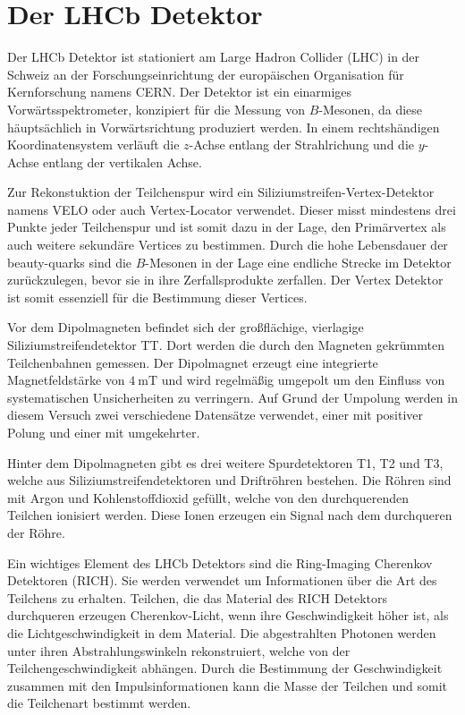 \section{Der LHCb Detektor}
\label{sec:lhcb}

Der LHCb Detektor \cite{lhcb} ist stationiert am Large Hadron Collider (LHC) in
der Schweiz an der Forschungseinrichtung der europäischen
Organisation für Kernforschung namens CERN. Der Detektor ist ein einarmiges
Vorwärtsspektrometer, konzipiert für die Messung von $B$-Mesonen, da diese
häuptsächlich in Vorwärtsrichtung produziert werden. In einem rechtshändigen
Koordinatensystem verläuft die $z$-Achse entlang der Strahlrichung und die
$y$-Achse entlang der vertikalen Achse. \par

Zur Rekonstuktion der Teilchenspur wird ein Siliziumstreifen-Vertex-Detektor
namens VELO oder auch Vertex-Locator verwendet. Dieser misst mindestens drei
Punkte jeder Teilchenspur und ist somit dazu in der Lage, den Primärvertex als
auch weitere sekundäre Vertices zu bestimmen. Durch die hohe Lebensdauer der beauty-quarks
sind die $B$-Mesonen in der Lage eine endliche Strecke im Detektor zurückzulegen,
bevor sie in ihre Zerfallsprodukte zerfallen. Der Vertex Detektor ist somit
essenziell für die Bestimmung dieser Vertices. \par
Vor dem Dipolmagneten befindet sich
der großflächige, vierlagige Siliziumstreifendetektor TT. Dort werden die durch den
Magneten gekrümmten Teilchenbahnen gemessen. Der Dipolmagnet erzeugt eine
integrierte Magnetfeldstärke von $\SI{4}{\milli\tesla}$ und wird regelmäßig
umgepolt um den Einfluss von systematischen Unsicherheiten zu verringern. Auf Grund
der Umpolung werden in diesem Versuch zwei verschiedene Datensätze verwendet, einer
mit positiver Polung und einer mit umgekehrter. \par
Hinter dem Dipolmagneten gibt es drei weitere Spurdetektoren T1, T2 und T3, welche
aus Siliziumstreifendetektoren und Driftröhren bestehen. Die Röhren sind mit
Argon und Kohlenstoffdioxid gefüllt, welche von den durchquerenden Teilchen
ionisiert werden. Diese Ionen erzeugen ein Signal nach dem durchqueren der Röhre. \par

Ein wichtiges Element des LHCb Detektors sind die Ring-Imaging Cherenkov Detektoren (RICH).
Sie werden verwendet um Informationen über die Art des Teilchens zu erhalten. Teilchen,
die das Material des RICH Detektors durchqueren erzeugen Cherenkov-Licht, wenn
ihre Geschwindigkeit höher ist, als die Lichtgeschwindigkeit in dem Material. Die
abgestrahlten Photonen werden unter ihren Abstrahlungswinkeln rekonstruiert, welche
von der Teilchengeschwindigkeit abhängen. Durch die Bestimmung der Geschwindigkeit
zusammen mit den Impulsinformationen kann die Masse der Teilchen und somit die
Teilchenart bestimmt werden.\par

